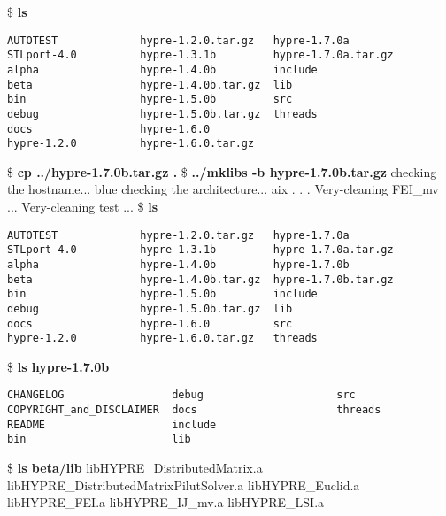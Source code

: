 \begin{ttfamily}
\begin{mdseries}
\$ \textbf{ls}\linebreak
\begin{verbatim}
AUTOTEST             hypre-1.2.0.tar.gz   hypre-1.7.0a
STLport-4.0          hypre-1.3.1b         hypre-1.7.0a.tar.gz
alpha                hypre-1.4.0b         include
beta                 hypre-1.4.0b.tar.gz  lib
bin                  hypre-1.5.0b         src
debug                hypre-1.5.0b.tar.gz  threads
docs                 hypre-1.6.0
hypre-1.2.0          hypre-1.6.0.tar.gz
\end{verbatim}
\$ \textbf{cp ../hypre-1.7.0b.tar.gz .}\linebreak
\$ \textbf{../mklibs -b hypre-1.7.0b.tar.gz}\linebreak
checking the hostname... blue\linebreak
checking the architecture... aix\linebreak
 . . .\linebreak
Very-cleaning FEI\_mv ...\linebreak
Very-cleaning test ...\linebreak
\$ \textbf{ls}\linebreak
\begin{verbatim}
AUTOTEST             hypre-1.2.0.tar.gz   hypre-1.7.0a
STLport-4.0          hypre-1.3.1b         hypre-1.7.0a.tar.gz
alpha                hypre-1.4.0b         hypre-1.7.0b
beta                 hypre-1.4.0b.tar.gz  hypre-1.7.0b.tar.gz
bin                  hypre-1.5.0b         include
debug                hypre-1.5.0b.tar.gz  lib
docs                 hypre-1.6.0          src
hypre-1.2.0          hypre-1.6.0.tar.gz   threads
\end{verbatim}
\$ \textbf{ls hypre-1.7.0b}\linebreak
\begin{verbatim}
CHANGELOG                 debug                     src
COPYRIGHT_and_DISCLAIMER  docs                      threads
README                    include
bin                       lib
\end{verbatim}
\$ \textbf{ls beta/lib}\linebreak
libHYPRE\_DistributedMatrix.a\linebreak
libHYPRE\_DistributedMatrixPilutSolver.a\linebreak
libHYPRE\_Euclid.a\linebreak
libHYPRE\_FEI.a\linebreak
libHYPRE\_IJ\_mv.a\linebreak
libHYPRE\_LSI.a\linebreak

\end{mdseries}
\end{ttfamily}
